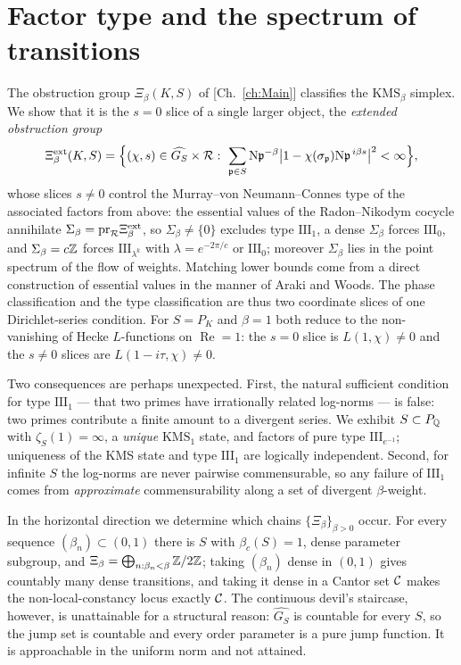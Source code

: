 \chapter[Factor type and the spectrum of transitions]{Factor type and the spectrum of transitions}\label{ch:I}
\renewcommand{\hZ}{\widehat{\mathbb{Z}}}
\begin{summary}
The obstruction group $\Xi_\beta(K,S)$ of [Ch.~\ref{ch:Main}] classifies the $\mathrm{KMS}_\beta$
simplex. We show that it is the $s=0$ slice of a single larger object, the \emph{extended
obstruction group}
\[
\Xiext(K,S)=\Bigl\{(\chi,s)\in\widehat{G_S}\times\R:\ \sum_{\pp\in S}\Ns\pp^{-\beta}\bigl|1-\chi(\sigma_\pp)\Ns\pp^{\,i\beta s}\bigr|^2<\infty\Bigr\},
\]
whose slices $s\ne0$ control the Murray--von Neumann--Connes type of the associated
factors from above: the essential values of the Radon--Nikodym cocycle annihilate
$\Sigma_\beta=\mathrm{pr}_{\mathcal{R}}\Xi^{\mathrm{ext}}_\beta$, so $\Sigma_\beta\ne\{0\}$ excludes type
$\mathrm{III}_1$, a dense $\Sigma_\beta$ forces $\mathrm{III}_0$, and $\Sigma_\beta=c\mathbb{Z}$
forces $\mathrm{III}_{\lambda^k}$ with $\lambda=e^{-2\pi/c}$ or $\mathrm{III}_0$; moreover
$\Sigma_\beta$ lies in the point spectrum of the flow of weights. Matching lower bounds come
from a direct construction of essential values in the manner of Araki and Woods. The phase
classification and the type classification are thus two coordinate slices of one
Dirichlet-series condition. For $S=P_K$ and $\beta=1$ both reduce to the non-vanishing of Hecke $L$-functions
on $\operatorname{Re}=1$: the $s=0$ slice is $L(1,\chi)\ne0$ and the $s\ne0$ slices are
$L(1-i\tau,\chi)\ne0$.

Two consequences are perhaps unexpected. First, the natural sufficient condition for type
$\mathrm{III}_1$ --- that two primes have irrationally related log-norms --- is false: two
primes contribute a finite amount to a divergent series. We exhibit $S\subset P_{\mathbb{Q}}$ with
$\zeta_S(1)=\infty$, a \emph{unique} $\mathrm{KMS}_1$ state, and factors of pure type
$\mathrm{III}_{e^{-1}}$; uniqueness of the KMS state and type $\mathrm{III}_1$ are logically
independent. Second, for infinite $S$ the log-norms are never pairwise commensurable, so any
failure of $\mathrm{III}_1$ comes from \emph{approximate} commensurability along a set of
divergent $\beta$-weight.

In the horizontal direction we determine which chains $\{\Xi_\beta\}_{\beta>0}$ occur. For
every sequence $(\beta_n)\subset(0,1)$ there is $S$ with $\beta_c(S)=1$, dense parameter
subgroup, and $\Xi_\beta=\bigoplus_{n:\beta_n<\beta}\mathbb{Z}/2\mathbb{Z}$; taking $(\beta_n)$ dense in
$(0,1)$ gives countably many dense transitions, and taking it dense in a Cantor set $\mathcal{C}$
makes the non-local-constancy locus exactly $\mathcal{C}$. The continuous devil's staircase, however,
is unattainable for a structural reason: $\widehat{G_S}$ is countable for every $S$, so the
jump set is countable and every order parameter is a pure jump function. It is approachable
in the uniform norm and not attained.
\end{summary}

